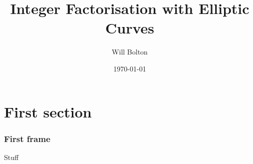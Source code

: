 \documentclass{beamer}
\title[Integer Factorisation with Elliptic Curves]{Integer Factorisation with Elliptic Curves}
\author{Will Bolton}
\date{\today}
\begin{document}
\titlepage
\section{First section}
\begin{frame}
\frametitle{First frame}
Stuff
\end{frame}
\end{document}
